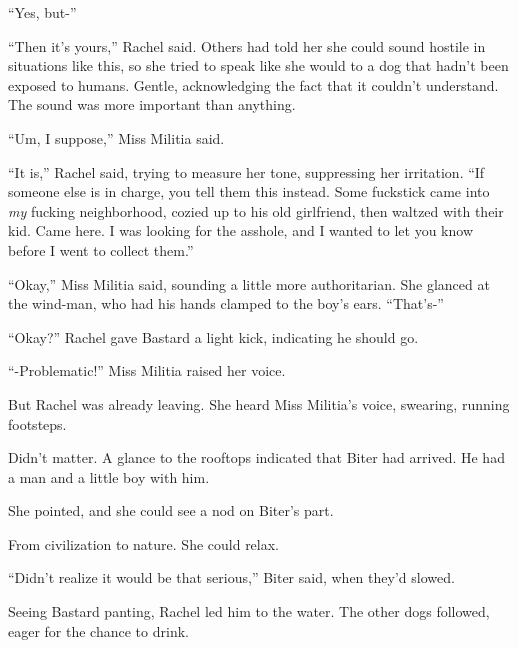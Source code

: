 ``Yes, but-''



``Then it's yours,'' Rachel said.  Others had told her she could sound hostile in situations like this, so she tried to speak like she would to a dog that hadn't been exposed to humans.  Gentle, acknowledging the fact that it couldn't understand.  The sound was more important than anything.



``Um, I suppose,'' Miss Militia said.



``It is,'' Rachel said, trying to measure her tone, suppressing her irritation.  ``If someone else is in charge, you tell them this instead.  Some fuckstick came into \emph{my} fucking neighborhood, cozied up to his old girlfriend, then waltzed with their kid.  Came here.  I was looking for the asshole, and I wanted to let you know before I went to collect them.''



``Okay,'' Miss Militia said, sounding a little more authoritarian.  She glanced at the wind-man, who had his hands clamped to the boy's ears.  ``That's-''



``Okay?''  Rachel gave Bastard a light kick, indicating he should go.



``-Problematic!''  Miss Militia raised her voice.



But Rachel was already leaving.  She heard Miss Militia's voice, swearing, running footsteps.



Didn't matter.  A glance to the rooftops indicated that Biter had arrived.  He had a man and a little boy with him.



She pointed, and she could see a nod on Biter's part.



\sectionbreak



From civilization to nature.  She could relax.



``Didn't realize it would be that serious,'' Biter said, when they'd slowed.



Seeing Bastard panting, Rachel led him to the water.  The other dogs followed, eager for the chance to drink.



